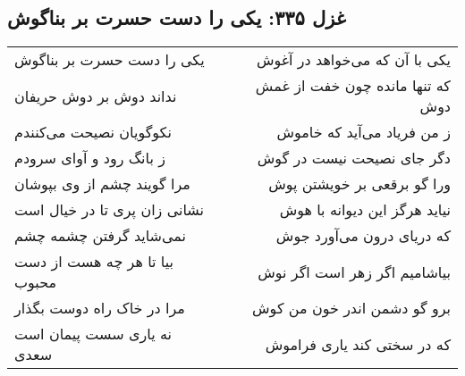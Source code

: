 \begin{center}
\section*{غزل ۳۳۵: یکی را دست حسرت بر بناگوش}
\label{sec:335}
\begin{longtable}{l p{0.5cm} r}
یکی را دست حسرت بر بناگوش
&&
یکی با آن که می‌خواهد در آغوش
\\
نداند دوش بر دوش حریفان
&&
که تنها مانده چون خفت از غمش دوش
\\
نکوگویان نصیحت می‌کنندم
&&
ز من فریاد می‌آید که خاموش
\\
ز بانگ رود و آوای سرودم
&&
دگر جای نصیحت نیست در گوش
\\
مرا گویند چشم از وی بپوشان
&&
ورا گو برقعی بر خویشتن پوش
\\
نشانی زان پری تا در خیال است
&&
نیاید هرگز این دیوانه با هوش
\\
نمی‌شاید گرفتن چشمه چشم
&&
که دریای درون می‌آورد جوش
\\
بیا تا هر چه هست از دست محبوب
&&
بیاشامیم اگر زهر است اگر نوش
\\
مرا در خاک راه دوست بگذار
&&
برو گو دشمن اندر خون من کوش
\\
نه یاری سست پیمان است سعدی
&&
که در سختی کند یاری فراموش
\\
\end{longtable}
\end{center}
